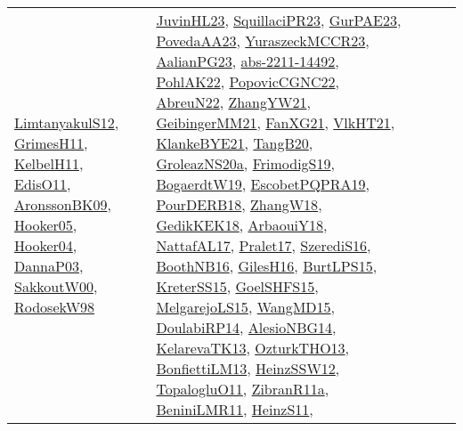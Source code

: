 {\begin{longtable}{lp{3cm}>{\raggedright}p{6cm}>{\raggedright}p{6cm}p{8cm}}
\href{articles/LimtanyakulS12.pdf}{LimtanyakulS12}\cite{LimtanyakulS12}, \href{papers/GrimesH11.pdf}{GrimesH11}\cite{GrimesH11}, \href{articles/KelbelH11.pdf}{KelbelH11}\cite{KelbelH11}, \href{papers/EdisO11.pdf}{EdisO11}\cite{EdisO11}, \href{papers/AronssonBK09.pdf}{AronssonBK09}\cite{AronssonBK09}, \href{articles/Hooker05.pdf}{Hooker05}\cite{Hooker05}, \href{papers/Hooker04.pdf}{Hooker04}\cite{Hooker04}, \href{papers/DannaP03.pdf}{DannaP03}\cite{DannaP03}, \href{articles/SakkoutW00.pdf}{SakkoutW00}\cite{SakkoutW00}, \href{papers/RodosekW98.pdf}{RodosekW98}\cite{RodosekW98} & \href{papers/JuvinHL23.pdf}{JuvinHL23}\cite{JuvinHL23}, \href{papers/SquillaciPR23.pdf}{SquillaciPR23}\cite{SquillaciPR23}, \href{articles/GurPAE23.pdf}{GurPAE23}\cite{GurPAE23}, \href{papers/PovedaAA23.pdf}{PovedaAA23}\cite{PovedaAA23}, \href{articles/YuraszeckMCCR23.pdf}{YuraszeckMCCR23}\cite{YuraszeckMCCR23}, \href{papers/AalianPG23.pdf}{AalianPG23}\cite{AalianPG23}, \href{articles/abs-2211-14492.pdf}{abs-2211-14492}\cite{abs-2211-14492}, \href{articles/PohlAK22.pdf}{PohlAK22}\cite{PohlAK22}, \href{papers/PopovicCGNC22.pdf}{PopovicCGNC22}\cite{PopovicCGNC22}, \href{articles/AbreuN22.pdf}{AbreuN22}\cite{AbreuN22}, \href{articles/ZhangYW21.pdf}{ZhangYW21}\cite{ZhangYW21}, \href{papers/GeibingerMM21.pdf}{GeibingerMM21}\cite{GeibingerMM21}, \href{articles/FanXG21.pdf}{FanXG21}\cite{FanXG21}, \href{articles/VlkHT21.pdf}{VlkHT21}\cite{VlkHT21}, \href{papers/KlankeBYE21.pdf}{KlankeBYE21}\cite{KlankeBYE21}, \href{papers/TangB20.pdf}{TangB20}\cite{TangB20}, \href{papers/GroleazNS20a.pdf}{GroleazNS20a}\cite{GroleazNS20a}, \href{papers/FrimodigS19.pdf}{FrimodigS19}\cite{FrimodigS19}, \href{papers/BogaerdtW19.pdf}{BogaerdtW19}\cite{BogaerdtW19}, \href{articles/EscobetPQPRA19.pdf}{EscobetPQPRA19}\cite{EscobetPQPRA19}, \href{articles/PourDERB18.pdf}{PourDERB18}\cite{PourDERB18}, \href{articles/ZhangW18.pdf}{ZhangW18}\cite{ZhangW18}, \href{articles/GedikKEK18.pdf}{GedikKEK18}\cite{GedikKEK18}, \href{papers/ArbaouiY18.pdf}{ArbaouiY18}\cite{ArbaouiY18}, \href{articles/NattafAL17.pdf}{NattafAL17}\cite{NattafAL17}, \href{papers/Pralet17.pdf}{Pralet17}\cite{Pralet17}, \href{papers/SzerediS16.pdf}{SzerediS16}\cite{SzerediS16}, \href{papers/BoothNB16.pdf}{BoothNB16}\cite{BoothNB16}, \href{papers/GilesH16.pdf}{GilesH16}\cite{GilesH16}, \href{papers/BurtLPS15.pdf}{BurtLPS15}\cite{BurtLPS15}, \href{papers/KreterSS15.pdf}{KreterSS15}\cite{KreterSS15}, \href{articles/GoelSHFS15.pdf}{GoelSHFS15}\cite{GoelSHFS15}, \href{papers/MelgarejoLS15.pdf}{MelgarejoLS15}\cite{MelgarejoLS15}, \href{articles/WangMD15.pdf}{WangMD15}\cite{WangMD15}, \href{papers/DoulabiRP14.pdf}{DoulabiRP14}\cite{DoulabiRP14}, \href{papers/AlesioNBG14.pdf}{AlesioNBG14}\cite{AlesioNBG14}, \href{papers/KelarevaTK13.pdf}{KelarevaTK13}\cite{KelarevaTK13}, \href{articles/OzturkTHO13.pdf}{OzturkTHO13}\cite{OzturkTHO13}, \href{papers/BonfiettiLM13.pdf}{BonfiettiLM13}\cite{BonfiettiLM13}, \href{articles/HeinzSSW12.pdf}{HeinzSSW12}\cite{HeinzSSW12}, \href{articles/TopalogluO11.pdf}{TopalogluO11}\cite{TopalogluO11}, \href{papers/ZibranR11a.pdf}{ZibranR11a}\cite{ZibranR11a}, \href{articles/BeniniLMR11.pdf}{BeniniLMR11}\cite{BeniniLMR11}, \href{papers/HeinzS11.pdf}{HeinzS11}\cite{HeinzS11}, 
\end{longtable}}
